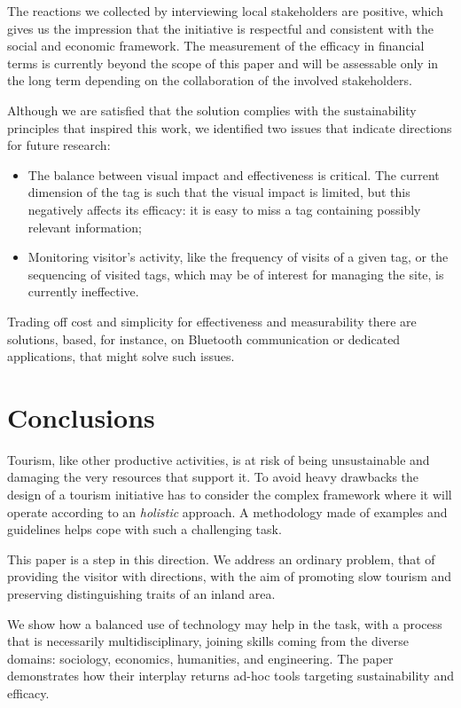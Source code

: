 \documentclass[sustainability,article,submit,pdftex,moreauthors]{Definitions/mdpi}
\begin{document}
The reactions we collected by interviewing local stakeholders are positive, which gives us the impression that the initiative is respectful and consistent with the social and economic framework. The measurement of the efficacy in financial terms is currently beyond the scope of this paper and will be assessable only in the long term depending on the collaboration of the involved stakeholders.

Although we are satisfied that the solution complies with the sustainability principles that inspired this work, we identified two issues that indicate directions for future research:

\begin{itemize}
    \item The balance between visual impact and effectiveness is critical. The current dimension of the tag is such that the visual impact is limited, but this negatively affects its efficacy: it is easy to miss a tag containing possibly relevant information;
    \item Monitoring visitor's activity, like the frequency of visits of a given tag, or the sequencing of visited tags, which may be of interest for managing the site, is currently ineffective.
\end{itemize}

Trading off cost and simplicity for effectiveness and measurability there are solutions, based, for instance, on Bluetooth communication or dedicated applications, that might solve such issues. 

\section{Conclusions}

Tourism, like other productive activities, is at risk of being unsustainable and damaging the very resources that support it. To avoid heavy drawbacks the design of a tourism initiative has to consider the complex framework where it will operate according to an \emph{holistic} approach. A methodology made of examples and guidelines helps cope with such a challenging task.

This paper is a step in this direction. We address an ordinary problem, that of providing the visitor with directions, with the aim of promoting slow tourism and preserving distinguishing traits of an inland area.

We show how a balanced use of technology may help in the task, with a process that is necessarily multidisciplinary, joining skills coming from the diverse domains: sociology, economics, humanities, and engineering. The paper demonstrates how their interplay returns ad-hoc tools targeting sustainability and efficacy.
\end{document}
